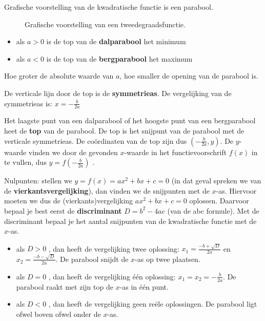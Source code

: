 Grafische voorstelling van de kwadratische functie
is een parabool.

\begin{figure}[H]
\centering

\caption{Grafische voorstelling van een tweedegraadsfunctie.}
\label{fig:tweede} 
\end{figure}

\begin{itemize}
\item als $a>0$ is de top van de \textbf{dalparabool} het minimum
\item als $a<0$ is de top van de \textbf{bergparabool} het maximum
\end{itemize}
Hoe groter de absolute waarde van $a$, hoe smaller de opening
van de parabool is.

De verticale lijn door de top is de \textbf{symmetrieas}.
De vergelijking van de symmetrieas is: $x=-\frac{b}{2a}$ 

Het laagste punt van een dalparabool of het hoogste punt
van een bergparabool heet de \textbf{top} van de parabool. De top
is het snijpunt van de parabool met de verticale symmetrieas. De co\"ordinaten
van de top zijn dus $(-\frac{b}{2a},y)$. De $y$-waarde vinden we
door de gevonden $x$-waarde in het functievoorschrift $f(x)$ in
te vullen, dus $y=f(-\frac{b}{2a})$ .

Nulpunten: stellen we $y=f(x)=ax^{2}+bx+c=0$
(in dat geval spreken we van de \textbf{vierkantsvergelijking}), dan
vinden we de snijpunten met de $x$-as. Hiervoor moeten we dus de
(vierkants)vergelijking $ax^{2}+bx+c=0$ oplossen. Daarvoor bepaal
je best eerst de \textbf{discriminant} $D=b^{2}-4ac$ (van de abc
formule). Met de discriminant bepaal je het aantal snijpunten van
de kwadratische functie met de $x$-as.
\begin{itemize}
\item als $D>0$ , dan heeft de vergelijking twee oplossing: $x_{1}=\frac{-b+\sqrt{D}}{2a}$
en $x_{2}=\frac{-b-\sqrt{D}}{2a}$. De parabool snijdt de $x$-as
op twee plaatsen.
\item als $D=0$ , dan heeft de vergelijking \'e\'en oplossing: $x_{1}=x_{2}=-\frac{b}{2a}$.
De parabool raakt met zijn top de $x$-as in \'e\'en punt.
\item als $D<0$ , dan heeft de vergelijking geen re\"ele oplossingen. De
parabool ligt ofwel boven ofwel onder de $x$-as.
\end{itemize}

